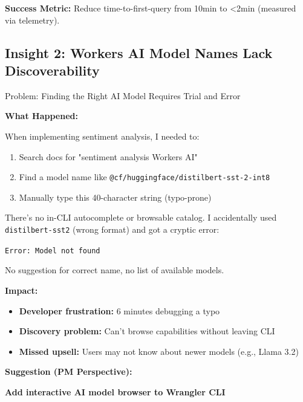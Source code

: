 \documentclass[11pt,a4paper]{article}
\begin{document}
\textbf{Success Metric:} Reduce time-to-first-query from 10min to <2min (measured via telemetry).

\newpage

\subsection{Insight 2: Workers AI Model Names Lack Discoverability}

\begin{insightbox}{Problem: Finding the Right AI Model Requires Trial and Error}

\textbf{What Happened:}

When implementing sentiment analysis, I needed to:
\begin{enumerate}
    \item Search docs for "sentiment analysis Workers AI"
    \item Find a model name like \texttt{@cf/huggingface/distilbert-sst-2-int8}
    \item Manually type this 40-character string (typo-prone)
\end{enumerate}

There's no in-CLI autocomplete or browsable catalog. I accidentally used \texttt{distilbert-sst2} (wrong format) and got a cryptic error:

\texttt{Error: Model not found}

No suggestion for correct name, no list of available models.

\vspace{0.5em}

\textbf{Impact:}
\begin{itemize}
    \item \textbf{Developer frustration:} 6 minutes debugging a typo
    \item \textbf{Discovery problem:} Can't browse capabilities without leaving CLI
    \item \textbf{Missed upsell:} Users may not know about newer models (e.g., Llama 3.2)
\end{itemize}

\end{insightbox}

\textbf{Suggestion (PM Perspective):}

\textcolor{cfOrange}{\textbf{Add interactive AI model browser to Wrangler CLI}}
\end{document}
